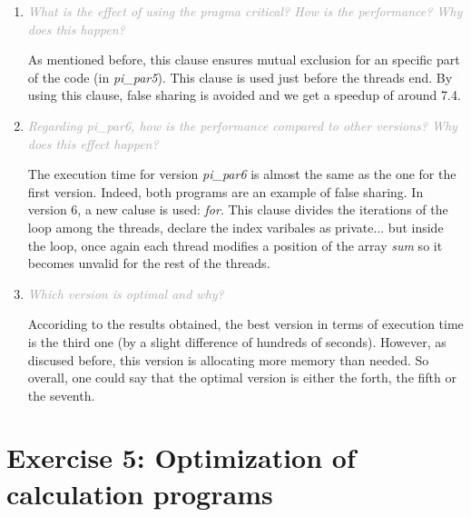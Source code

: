 \documentclass{article}
\newcommand{\greyItem}[1]{\item\emph{\textcolor{darkgray}{#1}}}
\begin{document}
\begin{enumerate}[label=4.\arabic*,leftmargin=*]
\greyItem{What is the effect of using the pragma critical? How is the performance? Why does this happen?}

As mentioned before, this clause ensures mutual exclusion for an specific part of the code (in \emph{pi\_par5}). This clause is used just before the threads end. By using this clause, false sharing is avoided and we get a speedup of around 7.4. 

\greyItem{Regarding pi\_par6, how is the performance compared to other versions? Why does this effect happen?}

The execution time for version \emph{pi\_par6} is almost the same as the one for the first version. Indeed, both programs are an example of false sharing. In version 6, a new caluse is used: \emph{for}. This clause divides the iterations of the loop among the threads, declare the index varibales as private... but inside the loop, once again each thread modifies a position of the array \emph{sum} so it becomes unvalid for the rest of the threads.

\greyItem{Which version is optimal and why?} 

Accoriding to the results obtained, the best version in terms of execution time is the third one (by a slight difference of hundreds of seconds). However, as discused before, this version is allocating more memory than needed. So overall, one could say that the optimal version is either the forth, the fifth or the seventh.

\end{enumerate}

\pagebreak

\section{Exercise 5: Optimization	of	calculation	programs}
\end{document}
